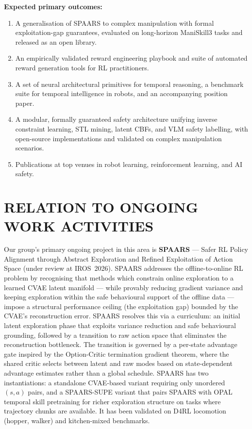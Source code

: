 \documentclass[11pt,a4paper]{article}
\begin{document}
\textbf{Expected primary outcomes:}
\begin{enumerate}[leftmargin=*, itemsep=2pt]
  \item A generalisation of SPAARS to complex manipulation with formal exploitation-gap
    guarantees, evaluated on long-horizon ManiSkill3 tasks and released as an open library.
  \item An empirically validated reward engineering playbook and suite of automated
    reward generation tools for RL practitioners.
  \item A set of neural architectural primitives for temporal reasoning, a benchmark suite
    for temporal intelligence in robots, and an accompanying position paper.
  \item A modular, formally guaranteed safety architecture unifying inverse constraint
    learning, STL mining, latent CBFs, and VLM safety labelling, with open-source
    implementations and validated on complex manipulation scenarios.
  \item Publications at top venues in robot learning, reinforcement learning, and AI safety.
\end{enumerate}

\section*{RELATION TO ONGOING WORK ACTIVITIES}

Our group's primary ongoing project in this area is \textbf{SPAARS} ---
Safer RL Policy Alignment through Abstract Exploration and Refined Exploitation
of Action Space (under review at IROS~2026).
SPAARS addresses the offline-to-online RL problem by recognising that methods which
constrain online exploration to a learned CVAE latent manifold --- while provably reducing
gradient variance and keeping exploration within the safe behavioural support of the
offline data --- impose a structural performance ceiling (the exploitation gap) bounded
by the CVAE's reconstruction error.
SPAARS resolves this via a curriculum: an initial latent exploration phase that exploits
variance reduction and safe behavioural grounding, followed by a transition to raw action
space that eliminates the reconstruction bottleneck.
The transition is governed by a per-state advantage gate inspired by the Option-Critic
termination gradient theorem, where the shared critic selects between latent and raw
modes based on state-dependent advantage estimates rather than a global schedule.
SPAARS has two instantiations: a standalone CVAE-based variant requiring only unordered
$(s, a)$ pairs, and a SPAARS-SUPE variant that pairs SPAARS with OPAL temporal skill
pretraining for richer exploration structure on tasks where trajectory chunks are
available.
It has been validated on D4RL locomotion (hopper, walker) and kitchen-mixed benchmarks.
\end{document}
